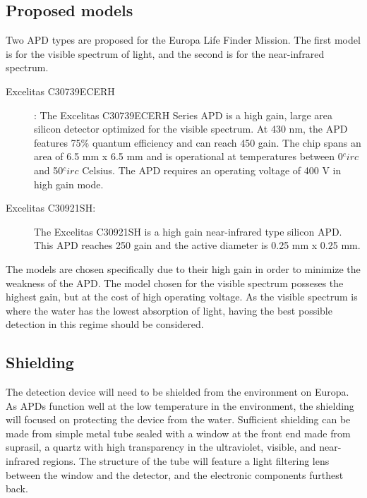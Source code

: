 \subsection{Proposed models}
Two APD types are proposed for the Europa Life Finder Mission. The first model is for the visible spectrum of light, and the second is for the near-infrared spectrum.

\begin{description}
\item[Excelitas C30739ECERH]:
The Excelitas C30739ECERH Series APD is a high gain, large area silicon detector optimized for the visible spectrum. At 430 nm, the APD features 75\% quantum efficiency and can reach 450 gain. The chip spans an area of 6.5 mm x 6.5 mm and is operational at temperatures between 0$^circ$ and 50$^circ$ Celsius. The APD requires an operating voltage of 400 V in high gain mode. \cite{APD_visible}
\item[Excelitas C30921SH:]
The Excelitas C30921SH is a high gain near-infrared type silicon APD. This APD reaches 250 gain and the active diameter is 0.25 mm x 0.25 mm. \cite{APD_infrared}
\end{description}

The models are chosen specifically due to their high gain in order to minimize the weakness of the APD. The model chosen for the visible spectrum posseses the highest gain, but at the cost of high operating voltage. As the visible spectrum is where the water has the lowest absorption of light, having the best possible detection in this regime should be considered.

\subsection{Shielding}
The detection device will need to be shielded from the environment on Europa. As APDs function well at the low temperature in the environment, the shielding will focused on protecting the device from the water. Sufficient shielding can be made from simple metal tube sealed with a window at the front end made from suprasil, a quartz with high transparency in the ultraviolet, visible, and near-infrared regions. The structure of the tube will feature a light filtering lens between the window and the detector, and the electronic components furthest back.

